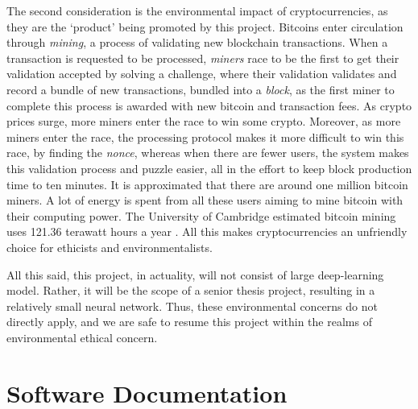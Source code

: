 \documentclass[10pt,twocolumn]{article}
\begin{document}
The second consideration is the environmental impact of cryptocurrencies, as they are the `product' being promoted by this project. Bitcoins enter circulation through \textit{mining}, a process of validating new blockchain transactions. When a transaction is requested to be processed, \textit{miners} race to be the first to get their validation accepted by solving a challenge, where their validation validates and record a bundle of new transactions, bundled into a \textit{block}, as the first miner to complete this process is awarded with new bitcoin and transaction fees. As crypto prices surge, more miners enter the race to win some crypto. Moreover, as more miners enter the race, the processing protocol makes it more difficult to win this race, by finding the \textit{nonce}, whereas when there are fewer users, the system makes this validation process and puzzle easier, all in the effort to keep block production time to ten minutes. It is approximated that there are around one million bitcoin miners. A lot of energy is spent from all these users aiming to mine bitcoin with their computing power. The University of Cambridge estimated bitcoin mining uses 121.36 terawatt hours a year \cite{BitcoinImpactOnClimate}. All this makes cryptocurrencies an unfriendly choice for ethicists and environmentalists.

All this said, this project, in actuality, will not consist of large deep-learning model. Rather, it will be the scope of a senior thesis project, resulting in a relatively small neural network. Thus, these environmental concerns do not directly apply, and we are safe to resume this project within the realms of environmental ethical concern.



\section{Software Documentation}


\printbibliography 
\end{document}
